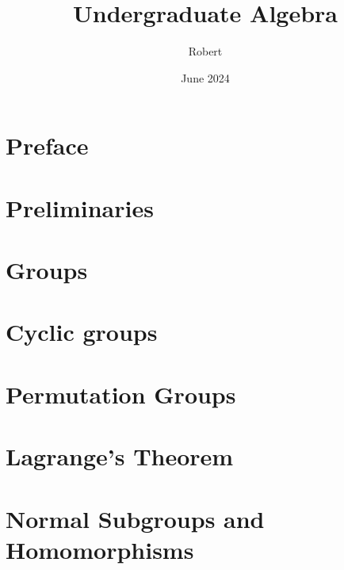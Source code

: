 \documentclass[twoside]{book}
\title{Undergraduate Algebra}
\author{Robert}
\date{June 2024}
\makeatletter
\edef\myauthor{\@author}
\edef\mytitle{\@title}
\makeatother
\begin{document}
\pagestyle{fancy}

\frontmatter
{}

\tableofcontents

\listoftheorems[ignoreall, show={theorem}]
\chapter*{Preface}


\mainmatter
\setcounter{chapter}{-1}
\chapter{Preliminaries}



\chapter{Groups}
\label{chapter:groups}


\chapter{Cyclic groups}
\label{chapter:cyclic-groups}


\chapter{Permutation Groups}
\label{chapter:permutation-groups}


\chapter{Lagrange's Theorem}
\label{chapter:lagrange-theorem}



\chapter{Normal Subgroups and Homomorphisms}
\label{chapter:normal-subgroups-homomorphisms}

\end{document}
